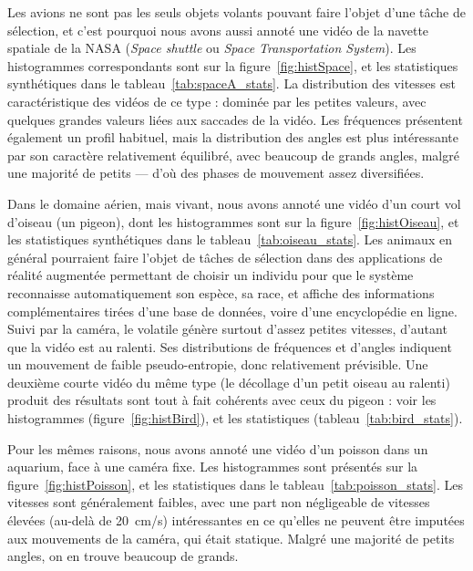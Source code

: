 	Les avions ne sont pas les seuls objets volants pouvant faire l'objet d'une tâche de sélection, et c'est pourquoi nous avons aussi annoté une vidéo de la navette spatiale de la NASA (\emph{Space shuttle} ou \emph{Space Transportation System}). Les histogrammes correspondants sont sur la figure~\ref{fig:histSpace}, et les statistiques synthétiques dans le tableau~\ref{tab:spaceA_stats}. La distribution des vitesses est caractéristique des vidéos de ce type : dominée par les petites valeurs, avec quelques grandes valeurs liées aux saccades de la vidéo. Les fréquences présentent également un profil habituel, mais la distribution des angles est plus intéressante par son caractère relativement équilibré, avec beaucoup de grands angles, malgré une majorité de petits --- d'où des phases de mouvement assez diversifiées.
	
	Dans le domaine aérien, mais vivant, nous avons annoté une vidéo d'un court vol d'oiseau (un pigeon), dont les histogrammes sont sur la figure~\ref{fig:histOiseau}, et les statistiques synthétiques dans le tableau~\ref{tab:oiseau_stats}. Les animaux en général pourraient faire l'objet de tâches de sélection dans des applications de réalité augmentée permettant de choisir un individu pour que le système reconnaisse automatiquement son espèce, sa race, et affiche des informations complémentaires tirées d'une base de données, voire d'une encyclopédie en ligne. Suivi par la caméra, le volatile génère surtout d'assez petites vitesses, d'autant que la vidéo est au ralenti. Ses distributions de fréquences et d'angles indiquent un mouvement de faible pseudo-entropie, donc relativement prévisible. Une deuxième courte vidéo du même type (le décollage d'un petit oiseau au ralenti) produit des résultats sont tout à fait cohérents avec ceux du pigeon : voir les histogrammes (figure~\ref{fig:histBird}), et les statistiques (tableau~\ref{tab:bird_stats}).

	Pour les mêmes raisons, nous avons annoté une vidéo d'un poisson dans un aquarium, face à une caméra fixe. Les histogrammes sont présentés sur la figure~\ref{fig:histPoisson}, et les statistiques dans le tableau~\ref{tab:poisson_stats}. Les vitesses sont généralement faibles, avec une part non négligeable de vitesses élevées (au-delà de 20~cm/s) intéressantes en ce qu'elles ne peuvent être imputées aux mouvements de la caméra, qui était statique. Malgré une majorité de petits angles, on en trouve beaucoup de grands.
	
